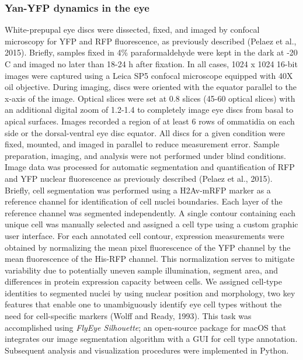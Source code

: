 \subsubsection{Yan-YFP dynamics in the eye}
\label{appendix:supp:metabolism:exp:yan}

White-prepupal eye discs were dissected, fixed, and imaged by confocal microscopy for YFP and RFP fluorescence, as previously described (Pelaez et al., 2015). Briefly, samples fixed in 4\% paraformaldehyde were kept in the dark at -20 \textdegree{}C and imaged no later than 18-24 h after fixation. In all cases, 1024 x 1024 16-bit images were captured using a Leica SP5 confocal microscope equipped with 40X oil objective. During imaging, discs were oriented with the equator parallel to the x-axis of the image. Optical slices were set at 0.8 \mum slices (45-60 optical slices) with an additional digital zoom of 1.2-1.4 to completely image eye discs from basal to apical surfaces. Images recorded a region of at least 6 rows of ommatidia on each side or the dorsal-ventral eye disc equator. All discs for a given condition were fixed, mounted, and imaged in parallel to reduce measurement error. Sample preparation, imaging, and analysis were not performed under blind conditions. Image data was processed for automatic segmentation and quantification of RFP and YFP nuclear fluorescence as previously described (Pelaez et al., 2015). Briefly, cell segmentation was performed using a H2Av-mRFP marker as a reference channel for identification of cell nuclei boundaries. Each layer of the reference channel was segmented independently. A single contour containing each unique cell was manually selected and assigned a cell type using a custom graphic user interface. For each annotated cell contour, expression measurements were obtained by normalizing the mean pixel fluorescence of the YFP channel by the mean fluorescence of the His-RFP channel. This normalization serves to mitigate variability due to potentially uneven sample illumination, segment area, and differences in protein expression capacity between cells. We assigned cell-type identities to segmented nuclei by using nuclear position and morphology, two key features that enable one to unambiguously identify eye cell types without the need for cell-specific markers (Wolff and Ready, 1993). This task was accomplished using \textit{FlyEye Silhouette}; an open-source package for macOS that integrates our image segmentation algorithm with a GUI for cell type annotation. Subsequent analysis and visualization procedures were implemented in Python.

